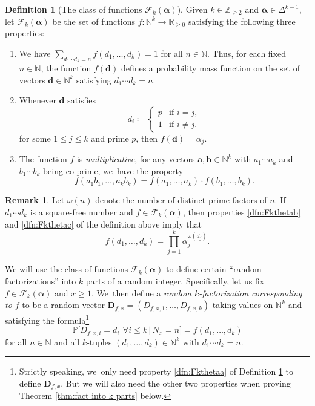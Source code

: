 \documentclass[10pt]{amsart}
\newenvironment{enumeratea}
{\bgroup\def\theenumi{\alph{enumi}}\begin{enumerate}}
{\end{enumerate}\egroup}
\newcommand{\ba}{{\boldsymbol a}}
\newcommand{\bb}{{\boldsymbol b}}
\newcommand{\bd}{{\boldsymbol d}}
\newcommand{\bD}{{\boldsymbol D}}
\newcommand{\NN}{\mathbb{N}}
\newcommand{\ZZ}{\mathbb{Z}}
\newcommand{\RR}{\mathbb{R}}
\newcommand{\PP}{\mathbb{P}}
\newcommand{\boldalpha}{\boldsymbol{\alpha}}
\newcommand{\simplex}{\Delta^{k-1}}
\newcommand{\bgg}{\Big}
\theoremstyle{plain}
\theoremstyle{definition}
\newtheorem{deff}[cor]{Definition}
\newtheorem*{rems}{Remark}
\begin{document}
\begin{deff}[The class of functions $\mathcal F_k(\boldalpha)$]\label{dfn:Fktheta}
Given $k\in\ZZ_{\ge2}$ and $\boldalpha\in \simplex$, let $\mathcal F_k(\boldalpha)$ be the set of functions $f \colon \NN^{k} \to \RR_{ \ge 0}$ satisfying the following three properties:
\begin{enumeratea}
\item\label{dfn:Fkthetaa} We have $\sum_{d_1\cdots d_k = n} f(d_1, \ldots, d_k) = 1$ for all $n \in \NN$. Thus, for each fixed $n \in \NN$, the function $f(\bd)$ defines a probability mass function on the set of vectors $\bd \in \NN^k$ satisfying $d_1\cdots d_k = n$.

\item\label{dfn:Fkthetab} Whenever $\bd$ satisfies
\[
d_i \coloneqq \begin{cases}
p &\text{if $i = j$}, \\
1 &\text{if $i \ne j$}.
\end{cases}
\]
for some $1 \le j \le k$ and prime $p$, then $f(\bd) = \alpha_j$.

\item\label{dfn:Fkthetac} The function $f$ is \emph{multiplicative}, \ie for any vectors $\ba, \bb \in \NN^k$ with $a_1\cdots a_k$ and $b_1 \cdots b_k$ being co-prime, we~have the property
\[
f(a_1b_1, \ldots, a_kb_k) = f(a_1, \ldots, a_k) \cdot f(b_1, \ldots, b_k).
\]
\end{enumeratea}
\end{deff}

\begin{rems}
Let $\omega(n)$ denote the number of distinct prime factors of $n$. If~$d_1\cdots d_k$ is a square-free number and $f\in\mathcal{F}_k (\boldalpha)$, then properties \eqref{dfn:Fkthetab} and \eqref{dfn:Fkthetac} of the definition above imply that
\begin{equation}
\label{eq:f on squarefrees}
f(d_1,\dots,d_k) = \prod_{j=1}^k \alpha_j^{\omega(d_j)}.
\end{equation}
\end{rems}

We will use the class of functions $\mathcal{F}_k(\boldalpha)$ to define certain ``random factorizations'' into $k$ parts of a random integer. Specifically, let us fix $f\in\mathcal{F}_k(\boldalpha)$ and $x\ge1$. We~then define a {\it random $k$-factorization corresponding to $f$} to be a random vector $\bD_{f, x}=(D_{f,x,1},\dots,D_{f,x,k})$ taking values on $\NN^k$ and satisfying the formula\footnote{Strictly speaking, we~only need property \eqref{dfn:Fkthetaa} of Definition \ref{dfn:Fktheta} to define $\bD_{f,x}$. But we will also need the other two properties when proving Theorem \ref{thm:fact into k parts} below.}
\begin{equation}
\label{eq:prob mass function f}
\PP\bgg[D_{f,x,i} = d_i \ \, \forall i \le k\, \bgg|\, N_x = n\bgg] = f(d_1, \ldots, d_k)
\end{equation}
for all $n\in\NN$ and all $k$-tuples $(d_1,\dots,d_k)\in\NN^k$ with $d_1\cdots d_k=n$.
\end{document}
